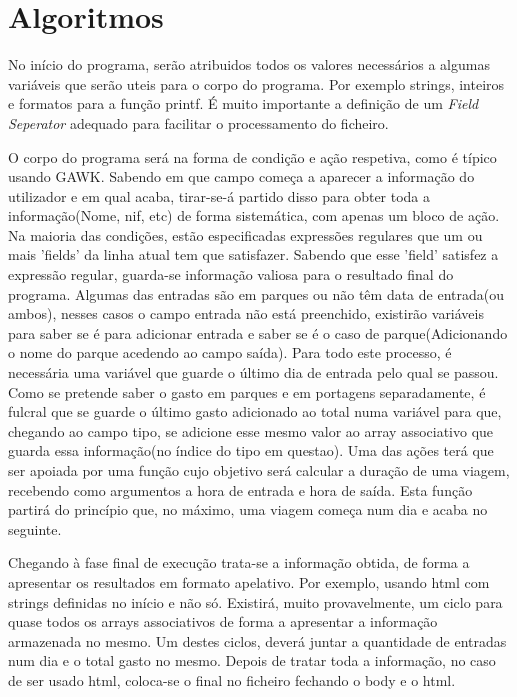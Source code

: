 \documentclass{report}
\def\fs{\emph{Field Seperator}\xspace}
\begin{document}
\section{Algoritmos}
No início do programa, serão atribuidos todos os valores necessários a algumas variáveis que serão uteis para o corpo do programa.
Por exemplo strings, inteiros e formatos para a função printf.
É muito importante a definição de um \fs adequado para facilitar o processamento do ficheiro.\par
O corpo do programa será na forma de condição e ação respetiva, como é típico usando GAWK.
Sabendo em que campo começa a aparecer a informação do utilizador e em qual acaba, tirar-se-á partido disso para obter toda a 
informação(Nome, nif, etc) de forma sistemática, com apenas um bloco de ação.
Na maioria das condições, estão especificadas expressões regulares que um ou mais 'fields' da linha atual tem que satisfazer. 
Sabendo que esse 'field' satisfez a expressão regular, guarda-se informação valiosa para o resultado final do programa. 
Algumas das entradas são em parques ou não têm data de entrada(ou ambos), nesses casos o campo entrada não
está preenchido, existirão variáveis para saber se é para adicionar entrada e saber se é o caso de parque(Adicionando o nome do 
parque acedendo ao campo saída). Para todo este processo, é necessária uma variável que guarde o último dia de entrada pelo qual se passou.
Como se pretende saber o gasto em parques e em portagens separadamente, é 
fulcral que se guarde o último gasto adicionado ao total numa variável para que, chegando ao campo tipo, se adicione esse mesmo valor 
ao array associativo que guarda essa informação(no índice do tipo em questao).
Uma das ações terá que ser apoiada por uma
função cujo objetivo será calcular a duração de uma viagem, recebendo como
argumentos a hora de entrada e hora de saída. Esta função partirá do 
princípio que, no máximo, uma viagem começa num dia e acaba no seguinte.
\par
Chegando à fase final de execução trata-se a informação obtida, de forma a apresentar os resultados em formato apelativo. Por exemplo, 
usando html com strings definidas no início e não só. Existirá, muito provavelmente, 
um ciclo para quase todos os arrays associativos de forma a apresentar a informação 
armazenada no mesmo. Um destes ciclos, deverá juntar a quantidade de entradas num dia e o total gasto no mesmo.
Depois de tratar toda a informação, no caso de ser usado html, coloca-se o final no ficheiro fechando o body e o html. 
\end{document}
